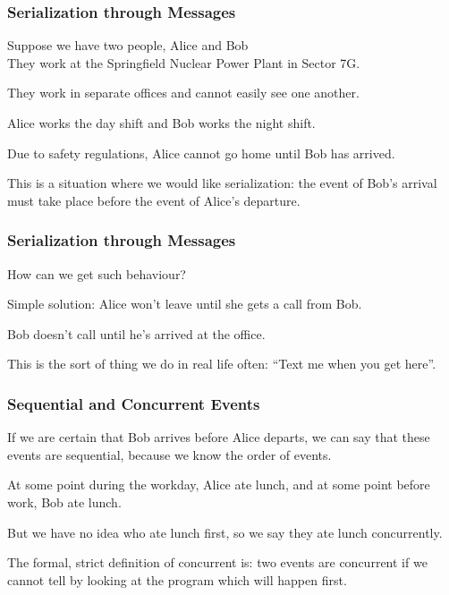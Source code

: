 \begin{frame}
\frametitle{Serialization through Messages}

Suppose we have two people, Alice and Bob\\
\quad They work at the Springfield Nuclear Power Plant in Sector 7G.

They work in separate offices and cannot easily see one another. 

Alice works the day shift and Bob works the night shift.

Due to safety regulations, Alice cannot go home until Bob has arrived. 

This is a situation where we would like serialization: the event of Bob's arrival must take place before the event of Alice's departure. 

\end{frame}

\begin{frame}
\frametitle{Serialization through Messages}

How can we get such behaviour? 

Simple solution: Alice won't leave until she gets a call from Bob. 

Bob doesn't call until he's arrived at the office. 

This is the sort of thing we do in real life often: ``Text me when you get here''.



\end{frame}

\begin{frame}
\frametitle{Sequential and Concurrent Events}

If we are certain that Bob arrives before Alice departs, we can say that these events are \alert{sequential}, because we know the order of events. 

At some point during the workday, Alice ate lunch, and at some point before work, Bob ate lunch. 

But we have no idea who ate lunch first, so we say they ate lunch \alert{concurrently}. 

The formal, strict definition of concurrent is: two events are concurrent if we cannot tell by looking at the program which will happen first. 

\end{frame}


